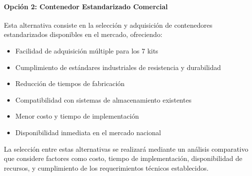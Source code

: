 \paragraph{Opción 2: Contenedor Estandarizado Comercial}

Esta alternativa consiste en la selección y adquisición de contenedores estandarizados disponibles en el mercado, ofreciendo:
\begin{itemize}
    \item Facilidad de adquisición múltiple para los 7 kits
    \item Cumplimiento de estándares industriales de resistencia y durabilidad
    \item Reducción de tiempos de fabricación
    \item Compatibilidad con sistemas de almacenamiento existentes
    \item Menor costo y tiempo de implementación
    \item Disponibilidad inmediata en el mercado nacional
\end{itemize}

La selección entre estas alternativas se realizará mediante un análisis comparativo que considere factores como costo, tiempo de implementación, disponibilidad de recursos, y cumplimiento de los requerimientos técnicos establecidos.











